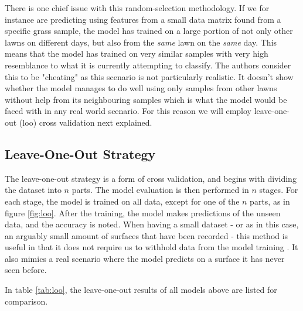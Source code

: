 There is one chief issue with this random-selection methodology. If we for instance are predicting using features from a small data matrix found from a specific grass sample, the model has trained on a large portion of not only other lawns on different days, but also from the \emph{same} lawn on the \emph{same} day. This means that the model has trained on very similar samples with very high resemblance to what it is currently attempting to classify. The authors consider this to be "cheating" as this scenario is not particularly realistic. It doesn't show whether the model manages to do well using only samples from other lawns without help from its neighbouring samples which is what the model would be faced with in any real world scenario. For this reason we will employ leave-one-out (\gls{loo}) cross validation next explained. 





\subsection{Leave-One-Out Strategy}

The leave-one-out strategy is a form of cross validation, and begins with dividing the dataset into $n$ parts. The model evaluation is then performed in $n$ stages. For each stage, the model is trained on all data, except for one of the $n$ parts, as in figure \ref{fig:loo}. After the training, the model makes predictions of the unseen data, and the accuracy is noted. When having a small dataset - or as in this case, an arguably small amount of surfaces that have been recorded - this method is useful in that it does not require us to withhold data from the model training \citep{raschka}. It also mimics a real scenario where the model predicts on a surface it has never seen before.

In table \ref{tab:loo}, the leave-one-out results of all models above are listed for comparison.


